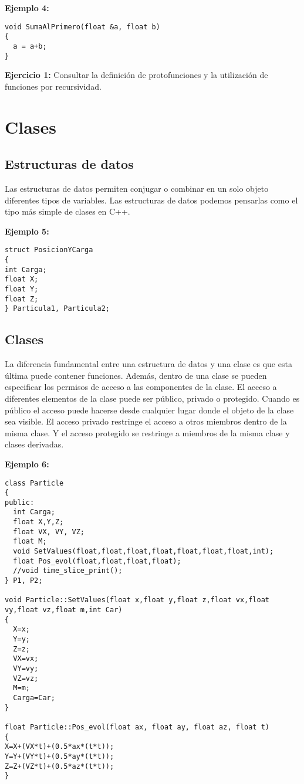\documentclass[10.5pt]{article}
\begin{document}
{\bf Ejemplo 4:}
\begin{verbatim}
void SumaAlPrimero(float &a, float b) 
{
  a = a+b;
}
\end{verbatim}

{\bf Ejercicio 1:} Consultar la definición de protofunciones y la utilización de funciones por recursividad.

\section{Clases}
\subsection{Estructuras de datos}

Las estructuras de datos permiten conjugar o combinar en un solo objeto diferentes tipos de variables. Las estructuras de datos podemos pensarlas como el tipo más simple de clases en C++.

{\bf Ejemplo 5:}
\begin{verbatim}
struct PosicionYCarga
{
int Carga;
float X;
float Y;
float Z;
} Particula1, Particula2;
\end{verbatim}

\subsection{Clases}

La diferencia fundamental entre una estructura de datos y una clase es que esta última puede contener funciones. Además, dentro de una clase se pueden especificar los permisos de acceso a las componentes de la clase. El acceso a diferentes elementos de la clase puede ser público, privado o protegido. Cuando es público el acceso puede hacerse desde cualquier lugar donde el objeto de la clase sea visible. El acceso privado restringe el acceso a otros miembros dentro de la misma clase. Y el acceso protegido se restringe a miembros de la misma clase y clases derivadas.

{\bf Ejemplo 6:}
\begin{verbatim}
class Particle
{
public:
  int Carga;
  float X,Y,Z;
  float VX, VY, VZ;
  float M;
  void SetValues(float,float,float,float,float,float,float,int);
  float Pos_evol(float,float,float,float);
  //void time_slice_print();
} P1, P2;

void Particle::SetValues(float x,float y,float z,float vx,float vy,float vz,float m,int Car)
{
  X=x;
  Y=y;
  Z=z;
  VX=vx;
  VY=vy;
  VZ=vz;
  M=m;
  Carga=Car;
}

float Particle::Pos_evol(float ax, float ay, float az, float t)
{
X=X+(VX*t)+(0.5*ax*(t*t));
Y=Y+(VY*t)+(0.5*ay*(t*t));
Z=Z+(VZ*t)+(0.5*az*(t*t));
}
\end{verbatim}

\end{document}
